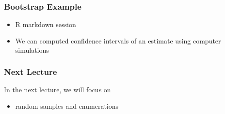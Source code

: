 \documentclass[10pt]{beamer}
\begin{document}
\begin{frame}
\frametitle{Bootstrap Example}

\begin{itemize}
\item R markdown session
\item We can computed confidence intervals of an estimate using computer simulations
\end{itemize}

\end{frame}

\begin{frame}
\frametitle{Next Lecture}

In the next lecture, we will focus on
\begin{itemize}
\item random samples and enumerations
\end{itemize}

\end{frame}
\end{document}
